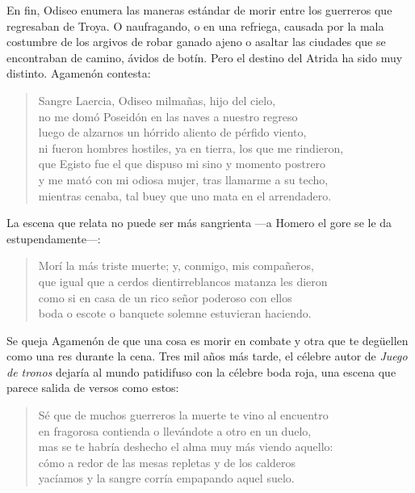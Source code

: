 En fin, Odiseo enumera las maneras estándar de morir entre los guerreros que regresaban de Troya. O naufragando, o en una refriega, causada por la mala costumbre de los argivos de robar ganado ajeno o asaltar las ciudades que se encontraban de camino, ávidos de botín. Pero el destino del Atrida ha sido muy distinto. Agamenón contesta:

\begin{verse}
Sangre Laercia, Odiseo milmañas, hijo del cielo,\\
no me domó Poseidón en las naves a nuestro regreso\\
luego de alzarnos un hórrido aliento de pérfido viento,\\
ni fueron hombres hostiles, ya en tierra, los que me rindieron,\\
que Egisto fue el que dispuso mi sino y momento postrero\\
y me mató con mi odiosa mujer, tras llamarme a su techo,\\
mientras cenaba, tal buey que uno mata en el arrendadero.
\end{verse}

La escena que relata no puede ser más sangrienta ---a Homero el gore se le da estupendamente---:

\begin{verse}
Morí la más triste muerte; y, conmigo, mis compañeros,\\
que igual que a cerdos dientirreblancos matanza les dieron\\
como si en casa de un rico señor poderoso con ellos\\
boda o escote o banquete solemne estuvieran haciendo.
\end{verse}

Se queja Agamenón de que una cosa es morir en combate y otra que te degüellen como una res durante la cena. Tres mil años más tarde, el célebre autor de \emph{Juego de tronos} dejaría al mundo patidifuso con la célebre boda roja, una escena que parece salida de versos como estos:

\begin{verse}
Sé que de muchos guerreros la muerte te vino al encuentro\\
en fragorosa contienda o llevándote a otro en un duelo,\\
mas se te habría deshecho el alma muy más viendo aquello:\\
cómo a redor de las mesas repletas y de los calderos\\
yacíamos y la sangre corría empapando aquel suelo.
\end{verse}

